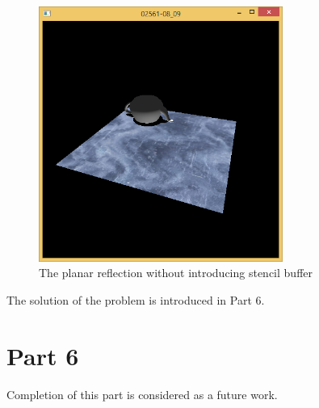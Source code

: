 \begin{figure}[hp]
\centering
\includegraphics[width=8cm]{../Screenshots/ex-9b/5-2.png}
\caption{The planar reflection without introducing stencil buffer}
\label{fig:9-5-2}
\end{figure}

The solution of the problem is introduced in Part 6.

\section{Part 6}


Completion of this part is considered as a future work.

